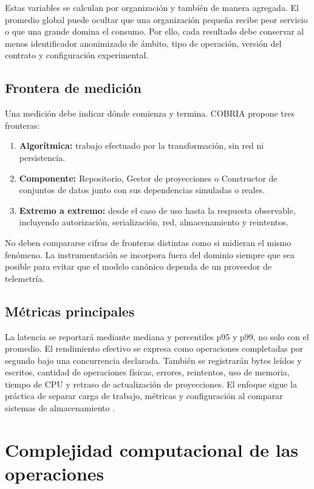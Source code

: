 Estas variables se calculan por organización y también de manera agregada. El promedio global
puede ocultar que una organización pequeña recibe peor servicio o que una grande domina el
consumo. Por ello, cada resultado debe conservar al menos identificador anonimizado de
ámbito, tipo de operación, versión del contrato y configuración experimental.

\section{Frontera de medición}

Una medición debe indicar dónde comienza y termina. COBRIA propone tres fronteras:

\begin{enumerate}[leftmargin=*]
  \item \textbf{Algorítmica:} trabajo efectuado por la transformación, sin red ni
  persistencia.
  \item \textbf{Componente:} Repositorio, Gestor de proyecciones o Constructor de conjuntos de datos junto
  con sus dependencias simuladas o reales.
  \item \textbf{Extremo a extremo:} desde el caso de uso hasta la respuesta observable,
  incluyendo autorización, serialización, red, almacenamiento y reintentos.
\end{enumerate}

No deben compararse cifras de fronteras distintas como si midieran el mismo fenómeno.
La instrumentación se incorpora fuera del dominio siempre que sea posible para evitar
que el modelo canónico dependa de un proveedor de telemetría.

\section{Métricas principales}

La latencia se reportará mediante mediana y percentiles p95 y p99, no solo con el
promedio. El rendimiento efectivo se expresa como operaciones completadas por segundo bajo una
concurrencia declarada. También se registrarán bytes leídos y escritos, cantidad de
operaciones físicas, errores, reintentos, uso de memoria, tiempo de CPU y retraso de
actualización de proyecciones. El enfoque sigue la práctica de separar carga de trabajo,
métricas y configuración al comparar sistemas de almacenamiento
\parencite{cooper2010ycsb,jain1991performance}.

\chapter{Complejidad computacional de las operaciones}

